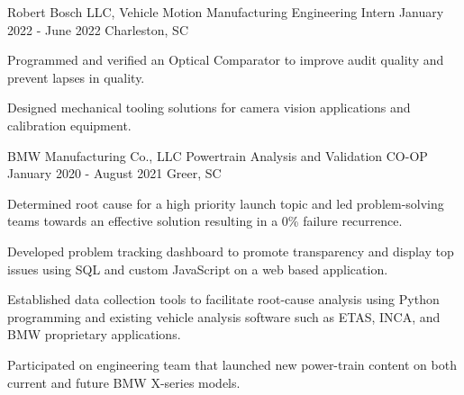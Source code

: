 \begin{cventries}
  \cventry
    {Robert Bosch LLC, Vehicle Motion} %
    {Manufacturing Engineering Intern} %
    {January 2022 - June 2022} %
    {Charleston, SC}
    {
      \begin{cvitems} %
        	\item {Programmed and verified an Optical Comparator to improve audit quality and prevent lapses in quality. }
 	\item {Designed mechanical tooling solutions for camera vision applications and calibration equipment.  }
      \end{cvitems}
    }

  \cventry
    {BMW Manufacturing Co., LLC} %
    {Powertrain Analysis and Validation CO-OP} %
    {January 2020 - August 2021} %
    {Greer, SC} %
    {
      \begin{cvitems} %
	\item {Determined root cause for a high priority launch topic and led problem-solving teams towards an effective solution resulting in a 0\% failure recurrence. }
	\item {Developed problem tracking dashboard to promote transparency and display top issues using SQL and custom JavaScript on a web based application.  }
	\item {Established data collection tools to facilitate root-cause analysis using Python programming and existing vehicle analysis software such as ETAS, INCA, and BMW proprietary applications.  }
	\item {Participated on engineering team that launched new power-train content on both current and future BMW X-series models. }
      \end{cvitems}
    }


\end{cventries}
